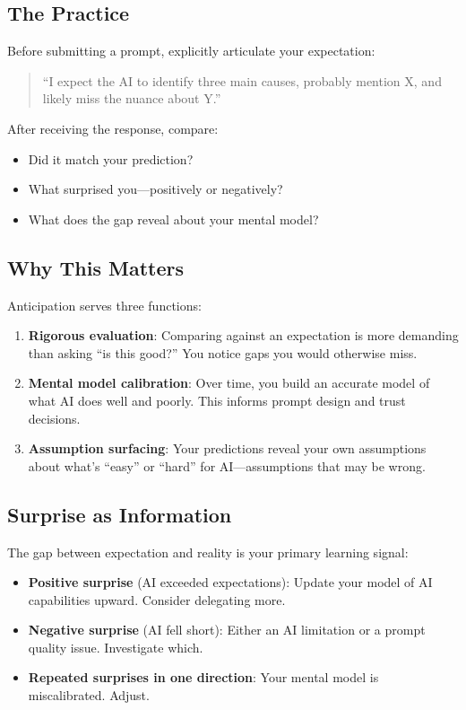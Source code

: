 \subsection{The Practice}

Before submitting a prompt, explicitly articulate your expectation:

\begin{quote}
``I expect the AI to identify three main causes, probably mention X, and likely miss the nuance about Y.''
\end{quote}

After receiving the response, compare:

\begin{itemize}
    \item Did it match your prediction?
    \item What surprised you---positively or negatively?
    \item What does the gap reveal about your mental model?
\end{itemize}

\subsection{Why This Matters}

Anticipation serves three functions:

\begin{enumerate}
    \item \textbf{Rigorous evaluation}: Comparing against an expectation is more demanding than asking ``is this good?'' You notice gaps you would otherwise miss.
    \item \textbf{Mental model calibration}: Over time, you build an accurate model of what AI does well and poorly. This informs prompt design and trust decisions.
    \item \textbf{Assumption surfacing}: Your predictions reveal your own assumptions about what's ``easy'' or ``hard'' for AI---assumptions that may be wrong.
\end{enumerate}

\subsection{Surprise as Information}

The gap between expectation and reality is your primary learning signal:

\begin{itemize}
    \item \textbf{Positive surprise} (AI exceeded expectations): Update your model of AI capabilities upward. Consider delegating more.
    \item \textbf{Negative surprise} (AI fell short): Either an AI limitation or a prompt quality issue. Investigate which.
    \item \textbf{Repeated surprises in one direction}: Your mental model is miscalibrated. Adjust.
\end{itemize}

